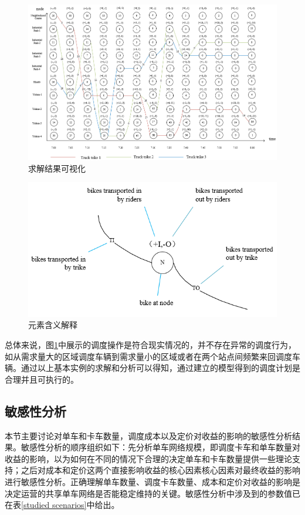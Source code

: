 \documentclass[]{tongjithesis}
\numberwithin{equation}{chapter}
\begin{document}
\begin{figure}[H]
    \centering
    \includegraphics[width=1.0 \textwidth]{figures_main/visualiza_solution_trike.png}
    \caption{求解结果可视化}
    \label{visualization}
\end{figure}

\begin{figure}[H]
    \centering
    \includegraphics[width=0.5 \textwidth]{figures_main/element_illustration.png}
    \caption{元素含义解释}
    \label{element_illus}
\end{figure}

总体来说，图\ref{visualization}中展示的调度操作是符合现实情况的，并不存在异常的调度行为，如从需求量大的区域调度车辆到需求量小的区域或者在两个站点间频繁来回调度车辆。通过以上基本实例的求解和分析可以得知，通过建立的模型得到的调度计划是合理并且可执行的。
\subsection{敏感性分析}
本节主要讨论对单车和卡车数量，调度成本以及定价对收益的影响的敏感性分析结果。敏感性分析的顺序组织如下：先分析单车网络规模，即调度卡车和单车数量对收益的影响，以为如何在不同的情况下合理的决定单车和卡车数量提供一些理论支持；之后对成本和定价这两个直接影响收益的核心因素核心因素对最终收益的影响进行敏感性分析。正确理解单车数量、调度卡车数量、成本和定价对收益的影响是决定运营的共享单车网络是否能稳定维持的关键。敏感性分析中涉及到的参数值已在表\ref{studied scenarios}中给出。
\end{document}
